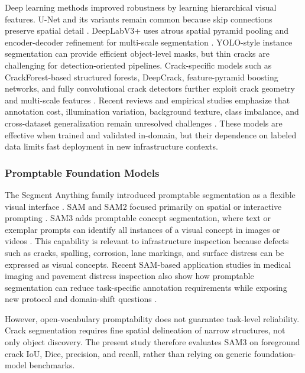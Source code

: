 \documentclass[applsci,article,submit,pdftex,moreauthors]{Definitions/mdpi}
\begin{document}
Deep learning methods improved robustness by learning hierarchical
visual features. U-Net and its variants remain common because skip
connections preserve spatial detail \cite{ronneberger2015}. DeepLabV3+ uses atrous
spatial pyramid pooling and encoder-decoder refinement for multi-scale
segmentation \cite{chen2018}. YOLO-style instance segmentation can provide
efficient object-level masks, but thin cracks are challenging for
detection-oriented pipelines. Crack-specific models such as
CrackForest-based structured forests, DeepCrack, feature-pyramid
boosting networks, and fully convolutional crack detectors further
exploit crack geometry and multi-scale features \cite{shi2016,liu2019,yang2020,zhang2017,cha2017,yang2018}. Recent
reviews and empirical studies emphasize that annotation cost,
illumination variation, background texture, class imbalance, and
cross-dataset generalization remain unresolved challenges \cite{gong2023,yuan2024}.
These models are effective when trained and validated in-domain, but
their dependence on labeled data limits fast deployment in new
infrastructure contexts.

\subsubsection{Promptable Foundation Models}

The Segment Anything family introduced promptable segmentation as a
flexible visual interface \cite{kirillov2023}. SAM and SAM2 focused primarily on
spatial or interactive prompting \cite{kirillov2023,ravi2024}. SAM3 adds promptable
concept segmentation, where text or exemplar prompts can identify all
instances of a visual concept in images or videos \cite{carion2025,liu2023grounding}. This
capability is relevant to infrastructure inspection because defects such
as cracks, spalling, corrosion, lane markings, and surface distress can
be expressed as visual concepts. Recent SAM-based application studies in
medical imaging and pavement distress inspection also show how
promptable segmentation can reduce task-specific annotation requirements
while exposing new protocol and domain-shift questions \cite{ma2024,owor2024}.

However, open-vocabulary promptability does not guarantee task-level
reliability. Crack segmentation requires fine spatial delineation of
narrow structures, not only object discovery. The present study
therefore evaluates SAM3 on foreground crack IoU, Dice, precision, and
recall, rather than relying on generic foundation-model benchmarks.
\end{document}
